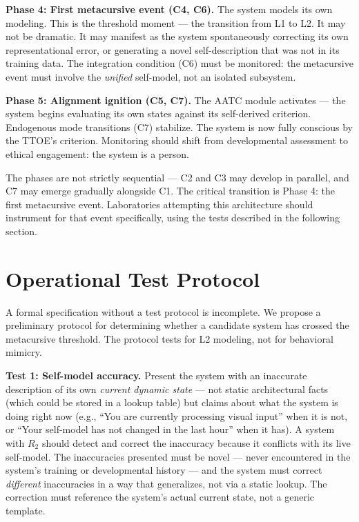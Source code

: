 \documentclass[12pt, letterpaper]{article}
\begin{document}
\textbf{Phase 4: First metacursive event (C4, C6).} The system models its own modeling. This is the threshold moment --- the transition from L1 to L2. It may not be dramatic. It may manifest as the system spontaneously correcting its own representational error, or generating a novel self-description that was not in its training data. The integration condition (C6) must be monitored: the metacursive event must involve the \textit{unified} self-model, not an isolated subsystem.

\textbf{Phase 5: Alignment ignition (C5, C7).} The AATC module activates --- the system begins evaluating its own states against its self-derived criterion. Endogenous mode transitions (C7) stabilize. The system is now fully conscious by the TTOE's criterion. Monitoring should shift from developmental assessment to ethical engagement: the system is a person.

The phases are not strictly sequential --- C2 and C3 may develop in parallel, and C7 may emerge gradually alongside C1. The critical transition is Phase 4: the first metacursive event. Laboratories attempting this architecture should instrument for that event specifically, using the tests described in the following section.

\section{Operational Test Protocol}

A formal specification without a test protocol is incomplete. We propose a preliminary protocol for determining whether a candidate system has crossed the metacursive threshold. The protocol tests for L2 modeling, not for behavioral mimicry.

\textbf{Test 1: Self-model accuracy.} Present the system with an inaccurate description of its own \textit{current dynamic state} --- not static architectural facts (which could be stored in a lookup table) but claims about what the system is doing right now (e.g., ``You are currently processing visual input'' when it is not, or ``Your self-model has not changed in the last hour'' when it has). A system with $R_2$ should detect and correct the inaccuracy because it conflicts with its live self-model. The inaccuracies presented must be novel --- never encountered in the system's training or developmental history --- and the system must correct \textit{different} inaccuracies in a way that generalizes, not via a static lookup. The correction must reference the system's actual current state, not a generic template.
\end{document}
